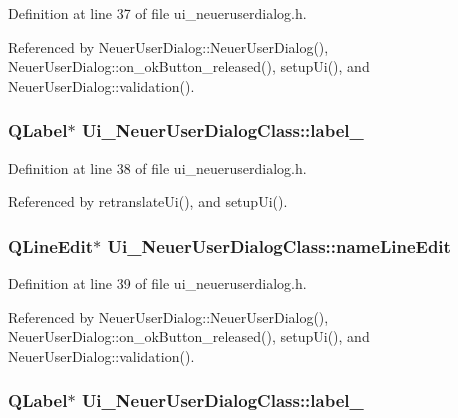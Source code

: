 Definition at line 37 of file ui\_\-neueruserdialog.h.

Referenced by NeuerUserDialog::NeuerUserDialog(), NeuerUserDialog::on\_\-okButton\_\-released(), setupUi(), and NeuerUserDialog::validation().\hypertarget{class_ui___neuer_user_dialog_class_58ec311f856ef3b73e496a2b2bac8019}{
\subsubsection[label\_\-8]{\setlength{\rightskip}{0pt plus 5cm}QLabel$\ast$ {\bf Ui\_\-NeuerUserDialogClass::label\_}}}
\label{class_ui___neuer_user_dialog_class_58ec311f856ef3b73e496a2b2bac8019}




Definition at line 38 of file ui\_\-neueruserdialog.h.

Referenced by retranslateUi(), and setupUi().\hypertarget{class_ui___neuer_user_dialog_class_5d7ac7d442a96686d9fa74ea43e9fe83}{
\subsubsection[nameLineEdit]{\setlength{\rightskip}{0pt plus 5cm}QLineEdit$\ast$ {\bf Ui\_\-NeuerUserDialogClass::nameLineEdit}}}
\label{class_ui___neuer_user_dialog_class_5d7ac7d442a96686d9fa74ea43e9fe83}




Definition at line 39 of file ui\_\-neueruserdialog.h.

Referenced by NeuerUserDialog::NeuerUserDialog(), NeuerUserDialog::on\_\-okButton\_\-released(), setupUi(), and NeuerUserDialog::validation().\hypertarget{class_ui___neuer_user_dialog_class_77eaebd40d06c047adadef94f8b5ffd5}{
\subsubsection[label\_\-2]{\setlength{\rightskip}{0pt plus 5cm}QLabel$\ast$ {\bf Ui\_\-NeuerUserDialogClass::label\_}}}
\label{class_ui___neuer_user_dialog_class_77eaebd40d06c047adadef94f8b5ffd5}




